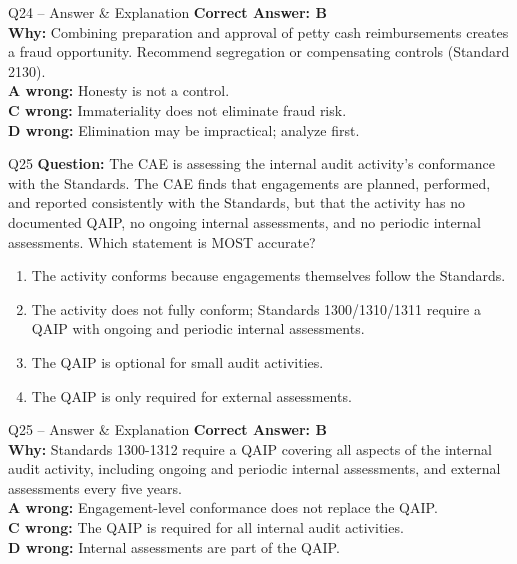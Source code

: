 \documentclass[aspectratio=169,10pt]{beamer}
\begin{document}
	\begin{frame}[t]{Q24 -- Answer \& Explanation}
		\small
		\textbf{Correct Answer: B} \\[4pt]
		\textbf{Why:} Combining preparation and approval of petty cash reimbursements creates a fraud opportunity. Recommend segregation or compensating controls (Standard 2130). \\[4pt]
		\textbf{A wrong:} Honesty is not a control. \\[2pt]
		\textbf{C wrong:} Immateriality does not eliminate fraud risk. \\[2pt]
		\textbf{D wrong:} Elimination may be impractical; analyze first.
	\end{frame}
	
	\begin{frame}[t]{Q25}
		\small
		\textbf{Question:} The CAE is assessing the internal audit activity's conformance with the Standards. The CAE finds that engagements are planned, performed, and reported consistently with the Standards, but that the activity has no documented QAIP, no ongoing internal assessments, and no periodic internal assessments. Which statement is MOST accurate?
		\begin{enumerate}[label=\Alph*.,itemsep=1pt,topsep=2pt]
			\item The activity conforms because engagements themselves follow the Standards.
			\item The activity does not fully conform; Standards 1300/1310/1311 require a QAIP with ongoing and periodic internal assessments.
			\item The QAIP is optional for small audit activities.
			\item The QAIP is only required for external assessments.
		\end{enumerate}
	\end{frame}
	
	\begin{frame}[t]{Q25 -- Answer \& Explanation}
		\small
		\textbf{Correct Answer: B} \\[4pt]
		\textbf{Why:} Standards 1300-1312 require a QAIP covering all aspects of the internal audit activity, including ongoing and periodic internal assessments, and external assessments every five years. \\[4pt]
		\textbf{A wrong:} Engagement-level conformance does not replace the QAIP. \\[2pt]
		\textbf{C wrong:} The QAIP is required for all internal audit activities. \\[2pt]
		\textbf{D wrong:} Internal assessments are part of the QAIP.
	\end{frame}
	
\end{document}
